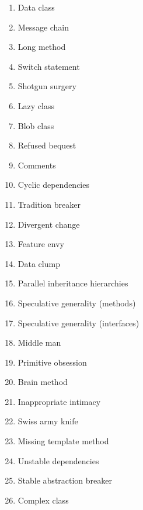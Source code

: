 \documentclass[12pt]{article}
\begin{document}
    \begin{enumerate}
        \item Data class
        \item Message chain
        \item Long method
        \item Switch statement
        \item Shotgun surgery
        \item Lazy class
        \item Blob class
        \item Refused bequest
        \item Comments
        \item Cyclic dependencies
        \item Tradition breaker
        \item Divergent change
        \item Feature envy
        \item Data clump
        \item Parallel inheritance hierarchies
        \item Speculative generality (methods)
        \item Speculative generality (interfaces)
        \item Middle man
        \item Primitive obsession
        \item Brain method
        \item Inappropriate intimacy
        \item Swiss army knife
        \item Missing template method
        \item Unstable dependencies
        \item Stable abstraction breaker
        \item Complex class
    \end{enumerate}

    \newpage
\end{document}
